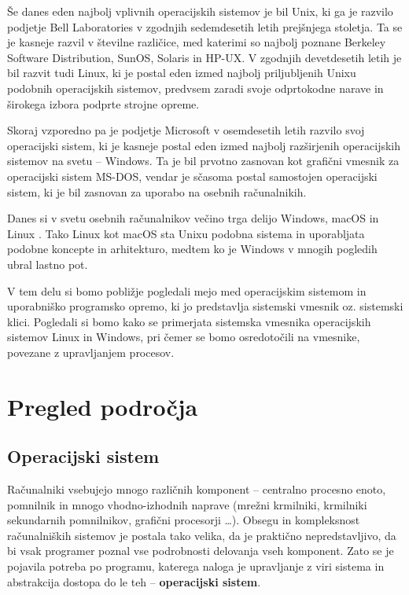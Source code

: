 \documentclass[a4paper,12pt,openright]{book}
\begin{document}
Še danes eden najbolj vplivnih operacijskih sistemov je bil Unix, ki ga je razvilo podjetje Bell Laboratories v zgodnjih sedemdesetih letih prejšnjega stoletja.
Ta se je kasneje razvil v številne različice, med katerimi so najbolj poznane Berkeley Software Distribution, SunOS, Solaris in HP-UX.
V zgodnjih devetdesetih letih je bil razvit tudi Linux, ki je postal eden izmed najbolj priljubljenih Unixu podobnih operacijskih sistemov, predvsem zaradi svoje odprtokodne narave in širokega izbora podprte strojne opreme.

Skoraj vzporedno pa je podjetje Microsoft v osemdesetih letih razvilo svoj operacijski sistem, ki je kasneje postal eden izmed najbolj razširjenih operacijskih sistemov na svetu -- Windows.
Ta je bil prvotno zasnovan kot grafični vmesnik za operacijski sistem MS-DOS, vendar je sčasoma postal samostojen operacijski sistem, ki je bil zasnovan za uporabo na osebnih računalnikih.

Danes si v svetu osebnih računalnikov večino trga delijo Windows, macOS in Linux \cite{Statcounter_OS_2024}.
Tako Linux kot macOS sta Unixu podobna sistema in uporabljata podobne koncepte in arhitekturo, medtem ko je Windows v mnogih pogledih ubral lastno pot.

V tem delu si bomo pobližje pogledali mejo med operacijskim sistemom in uporabniško programsko opremo, ki jo predstavlja sistemski vmesnik oz. sistemski klici.
Pogledali si bomo kako se primerjata sistemska vmesnika operacijskih sistemov Linux in Windows, pri čemer se bomo osredotočili na vmesnike, povezane z upravljanjem procesov.

\chapter{Pregled področja}

\section{Operacijski sistem}

Računalniki vsebujejo mnogo različnih komponent -- centralno procesno enoto, pomnilnik in mnogo vhodno-izhodnih naprave (mrežni krmilniki, krmilniki sekundarnih pomnilnikov, grafični procesorji \dots).
Obsegu in kompleksnost računalniških sistemov je postala tako velika, da je praktično nepredstavljivo, da bi vsak programer poznal vse podrobnosti delovanja vseh komponent.
Zato se je pojavila potreba po programu, katerega naloga je upravljanje z viri sistema in abstrakcija dostopa do le teh -- \textbf{operacijski sistem}.
\end{document}
